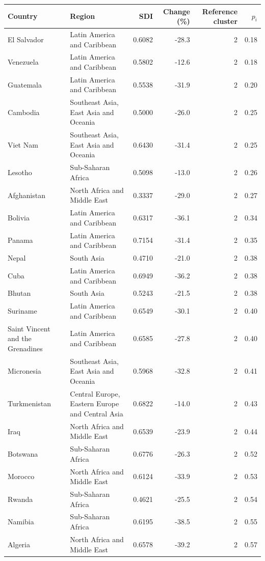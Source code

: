 \begin{tabular}{llrrrr}
\toprule
Country & Region & SDI & Change (\%) & Reference cluster & $p_i$ \\
\midrule
El Salvador & Latin America and Caribbean & 0.6082 & -28.3 & 2 & 0.18 \\
Venezuela & Latin America and Caribbean & 0.5802 & -12.6 & 2 & 0.18 \\
Guatemala & Latin America and Caribbean & 0.5538 & -31.9 & 2 & 0.20 \\
Cambodia & Southeast Asia, East Asia and Oceania & 0.5000 & -26.0 & 2 & 0.25 \\
Viet Nam & Southeast Asia, East Asia and Oceania & 0.6430 & -31.4 & 2 & 0.25 \\
Lesotho & Sub-Saharan Africa & 0.5098 & -13.0 & 2 & 0.26 \\
Afghanistan & North Africa and Middle East & 0.3337 & -29.0 & 2 & 0.27 \\
Bolivia & Latin America and Caribbean & 0.6317 & -36.1 & 2 & 0.34 \\
Panama & Latin America and Caribbean & 0.7154 & -31.4 & 2 & 0.35 \\
Nepal & South Asia & 0.4710 & -21.0 & 2 & 0.38 \\
Cuba & Latin America and Caribbean & 0.6949 & -36.2 & 2 & 0.38 \\
Bhutan & South Asia & 0.5243 & -21.5 & 2 & 0.38 \\
Suriname & Latin America and Caribbean & 0.6549 & -30.1 & 2 & 0.40 \\
Saint Vincent and the Grenadines & Latin America and Caribbean & 0.6585 & -27.8 & 2 & 0.40 \\
Micronesia & Southeast Asia, East Asia and Oceania & 0.5968 & -32.8 & 2 & 0.41 \\
Turkmenistan & Central Europe, Eastern Europe and Central Asia & 0.6822 & -14.0 & 2 & 0.43 \\
Iraq & North Africa and Middle East & 0.6539 & -23.9 & 2 & 0.44 \\
Botswana & Sub-Saharan Africa & 0.6776 & -26.3 & 2 & 0.52 \\
Morocco & North Africa and Middle East & 0.6124 & -33.9 & 2 & 0.53 \\
Rwanda & Sub-Saharan Africa & 0.4621 & -25.5 & 2 & 0.54 \\
Namibia & Sub-Saharan Africa & 0.6195 & -38.5 & 2 & 0.55 \\
Algeria & North Africa and Middle East & 0.6578 & -39.2 & 2 & 0.57 \\

\end{tabular}
